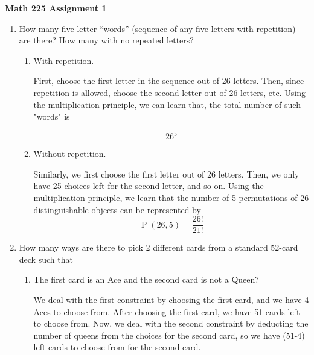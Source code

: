 \documentclass[12pt]{amsart}
\DeclareMathOperator{\perm}{P}
\begin{document}
\begin{center}
  \bfseries
  Math 225 Assignment 1\\
\end{center}

\begin{enumerate}
\item How many five-letter “words” (sequence of any five letters with repetition) are
there? How many with no repeated letters?
\bigskip
  \begin{enumerate}
  \item With repetition.            
 
  First, choose the first letter in the sequence out of 26 letters. Then, since repetition 
  is allowed, choose the second letter out of 26 letters, etc. Using the multiplication 
  principle, we can learn that, the total number of such "words" is     
  
   \begin{displaymath}
   26^5 
  \end{displaymath}

 
  \item Without repetition.       
  
  Similarly, we first choose the first letter out of 26 letters. Then, we only have 25 choices left for the second letter, and so on. Using the multiplication principle, we learn that the number of 5-permutations of 26 distinguishable objects can be 
  represented by 
     \begin{displaymath}
    \perm(26,5) = \frac{26!}{21!} 
  \end{displaymath}
  
  \end{enumerate}

 \bigskip


\item How many ways are there to pick 2 different cards from a standard 52-card deck
such that

\bigskip
  \begin{enumerate}
  \item The first card is an Ace and the second card is not a Queen? \smallskip
  
  We deal with the first constraint by choosing the first card, and we have 4 Aces to 
  choose from. After choosing the first card, we have 51 cards left to choose from.
  Now, we deal with the second constraint by deducting the number of 
  queens from the choices for the second card, so we have (51-4) left cards to choose 
  from for the second card. 


\end{enumerate}
\end{enumerate}
\end{document}
